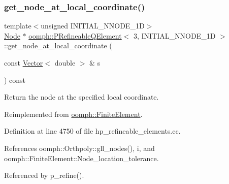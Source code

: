 \subsubsection{\texorpdfstring{get\+\_\+node\+\_\+at\+\_\+local\+\_\+coordinate()}{get\_node\_at\_local\_coordinate()}}
{\footnotesize\ttfamily template$<$unsigned I\+N\+I\+T\+I\+A\+L\+\_\+\+N\+N\+O\+D\+E\+\_\+1D$>$ \\
\hyperlink{classoomph_1_1Node}{Node} $\ast$ \hyperlink{classoomph_1_1PRefineableQElement}{oomph\+::\+P\+Refineable\+Q\+Element}$<$ 3, I\+N\+I\+T\+I\+A\+L\+\_\+\+N\+N\+O\+D\+E\+\_\+1D $>$\+::get\+\_\+node\+\_\+at\+\_\+local\+\_\+coordinate (\begin{DoxyParamCaption}\item[{const \hyperlink{classoomph_1_1Vector}{Vector}$<$ double $>$ \&}]{s }\end{DoxyParamCaption}) const\hspace{0.3cm}{\ttfamily [virtual]}}



Return the node at the specified local coordinate. 



Reimplemented from \hyperlink{classoomph_1_1FiniteElement_a2ddbb05c5f8bb35b64bec287d653105c}{oomph\+::\+Finite\+Element}.



Definition at line 4750 of file hp\+\_\+refineable\+\_\+elements.\+cc.



References oomph\+::\+Orthpoly\+::gll\+\_\+nodes(), i, and oomph\+::\+Finite\+Element\+::\+Node\+\_\+location\+\_\+tolerance.



Referenced by p\+\_\+refine().

\mbox{\label{classoomph_1_1PRefineableQElement_3_013_00_01INITIAL__NNODE__1D_01_4_a6a9ebb8e12fed777e3f704ebd6af2232}} 
